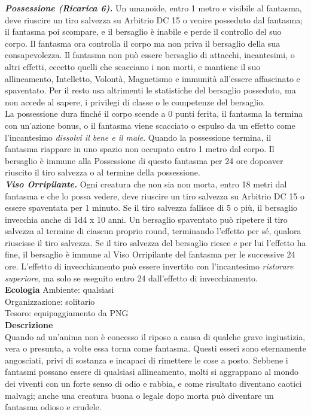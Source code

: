\begin{multicols}{2}
\emph{\textbf{Possessione (Ricarica 6).}} Un umanoide, entro 1 metro e visibile al fantasma, deve riuscire un tiro salvezza su Arbitrio DC  15 o venire posseduto dal fantasma; il fantasma poi scompare, e il bersaglio è inabile e perde il controllo del suo corpo. Il fantasma ora controlla il corpo ma non priva il bersaglio della sua consapevolezza. Il fantasma non può essere bersaglio di attacchi, incantesimi, o altri effetti, eccetto quelli che scacciano i non morti, e mantiene il suo allineamento, Intelletto, Volontà, Magnetismo e immunità all'essere affascinato e spaventato. Per il resto usa altrimenti le statistiche del bersaglio posseduto, ma non accede al sapere, i privilegi di classe o le competenze del bersaglio.\\
La possessione dura finché il corpo scende a 0 punti ferita, il fantasma la termina con un'azione bonus, o il fantasma viene scacciato o espulso da un effetto come l'incantesimo \emph{dissolvi il bene e il male}. Quando la possessione termina, il fantasma riappare in uno spazio non occupato entro 1 metro dal corpo. Il bersaglio è immune alla Possessione di questo fantasma per 24 ore dopoaver riuscito il tiro  salvezza o al termine della possessione.\\

\emph{\textbf{Viso Orripilante.}} Ogni creatura che non sia non morta, entro 18 metri  dal fantasma e che lo possa vedere, deve riuscire un tiro salvezza su Arbitrio DC  15 o essere spaventata per 1 minuto. Se il tiro salvezza  fallisce di 5 o più, il bersaglio invecchia anche di 1d4 x 10 anni. Un  bersaglio spaventato può ripetere il tiro salvezza al termine di ciascun  proprio round, terminando l'effetto per sé, qualora riuscisse il tiro  salvezza. Se il tiro salvezza del bersaglio riesce e per lui l'effetto ha fine, il  bersaglio è immune al Viso Orripilante del fantasma per le successive 24  ore. L'effetto di invecchiamento può essere invertito con l'incantesimo \emph{ristorare superiore}, ma solo se eseguito entro 24 dall'effetto di invecchiamento.\\
\textbf{Ecologia}
Ambiente: qualsiasi\\
Organizzazione: solitario\\
Tesoro: equipaggiamento da PNG\\
\textbf{Descrizione}\\
Quando ad un’anima non è concesso il riposo a causa di qualche grave ingiustizia, vera o presunta, a volte essa torna come fantasma. Questi esseri sono eternamente angosciati, privi di sostanza e incapaci di rimettere le cose a posto. Sebbene i fantasmi possano essere di qualsiasi allineamento, molti si aggrappano al mondo dei viventi con un forte senso di odio e rabbia, e come risultato diventano caotici malvagi; anche una creatura buona o legale dopo morta può diventare un fantasma odioso e crudele.\\


\end{multicols}
